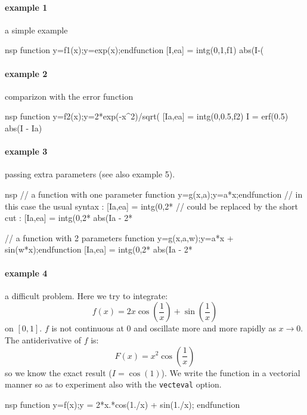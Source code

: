 \begin{examples}
  
\paragraph{example 1} a simple example 
\begin{mintednsp}{nsp}
function y=f1(x);y=exp(x);endfunction
[I,ea] = intg(0,1,f1)
abs(I-(%
\end{mintednsp}
  
\paragraph{example 2} comparizon with the error function
\begin{mintednsp}{nsp}
function y=f2(x);y=2*exp(-x^2)/sqrt(%
[Ia,ea] = intg(0,0.5,f2)
I = erf(0.5)
abs(I - Ia)
\end{mintednsp}
  
\paragraph{example 3} passing extra parameters (see also example 5). 
\begin{mintednsp}{nsp}
// a function with one parameter
function y=g(x,a);y=a*x;endfunction
// in this case the usual syntax :
[Ia,ea] = intg(0,2*%
// could be replaced by the short cut :
[Ia,ea] = intg(0,2*%
abs(Ia - 2*%

// a function with 2 parameters
function y=g(x,a,w);y=a*x + sin(w*x);endfunction
[Ia,ea] = intg(0,2*%
abs(Ia - 2*%
\end{mintednsp}

\paragraph{example 4} a difficult problem. Here we try to integrate:
$$
    f(x) = 2 x \cos \left(\frac{1}{x}\right) +  \sin \left(\frac{1}{x}\right)
$$ 
on $[0,1]$. $f$ is not continuous at $0$ and oscillate more and more
rapidly as $x \rightarrow 0$. The antiderivative of $f$
is:
$$
    F(x) = x^2  \cos \left(\frac{1}{x}\right)
$$
so we know the exact result ($I=\cos(1)$). We write the function in a vectorial
manner so as to experiment also with the \verb+vecteval+ option. 
\begin{mintednsp}{nsp}
function y=f(x);y = 2*x.*cos(1./x) + sin(1./x); endfunction


\end{mintednsp}
\end{examples}
